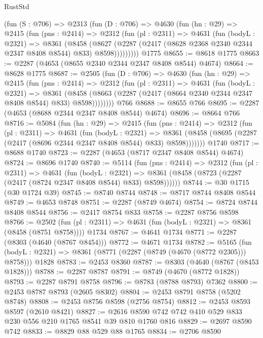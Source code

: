 \begin{lexlean}{RustStd}
\begin{coremodule}
    (fun (S : @706) =>
    @2313
      (fun (D : @706) =>
      @4630
        (fun (hn : @29) =>
        @2415
          (fun (pns : @2414) =>
          @2312
            (fun (pl : @2311) =>
            @4631
              (fun (bodyL : @2321) =>
              @8361
                (@8458
                  (@8627
                    (@2287 (@2417 (@8628 @2368 @2340 @2344 @2347 @8408 @8544) @833) @8598)))))))))
    @1775
@8655 := @8618 @1775
@8663 := @2287 (@4653 (@8655 @2340 @2344 @2347 @8408 @8544) @4674)
@8664 := @8628 @1775
@8687 := @2505
    (fun (D : @706) =>
    @4630
      (fun (hn : @29) =>
      @2415
        (fun (pns : @2414) =>
        @2312
          (fun (pl : @2311) =>
          @4631
            (fun (bodyL : @2321) =>
            @8361
              (@8458 (@8663 (@2287 (@2417 (@8664 @2340 @2344 @2347 @8408 @8544) @833) @8598))))))))
    @766
@8688 := @8655 @766
@8695 := @2287 (@4653 (@8688 @2344 @2347 @8408 @8544) @4674)
@8696 := @8664 @766
@8716 := @5084
    (fun (hn : @29) =>
    @2415
      (fun (pns : @2414) =>
      @2312
        (fun (pl : @2311) =>
        @4631
          (fun (bodyL : @2321) =>
          @8361 (@8458 (@8695 (@2287 (@2417 (@8696 @2344 @2347 @8408 @8544) @833) @8598)))))))
    @1740
@8717 := @8688 @1740
@8723 := @2287 (@4653 (@8717 @2347 @8408 @8544) @4674)
@8724 := @8696 @1740
@8740 := @5114
    (fun (pns : @2414) =>
    @2312
      (fun (pl : @2311) =>
      @4631
        (fun (bodyL : @2321) =>
        @8361 (@8458 (@8723 (@2287 (@2417 (@8724 @2347 @8408 @8544) @833) @8598))))))
@8744 := @30 @1715 (@30 @1724 @39)
@8745 := @8740 @8744
@8748 := @8717 @8744 @8408 @8544
@8749 := @4653 @8748
@8751 := @2287 (@8749 @4674)
@8754 := @8724 @8744 @8408 @8544
@8756 := @2417 @8754 @833
@8758 := @2287 @8756 @8598
@8766 := @2502
    (fun (pl : @2311) => @4631 (fun (bodyL : @2321) => @8361 (@8458 (@8751 @8758))))
    @1734
@8767 := @4641 @1734
@8771 := @2287 (@8303 (@4640 (@8767 @8454)))
@8772 := @4671 @1734
@8782 := @5165
    (fun (bodyL : @2321) => @8361 (@8771 (@2287 (@8749 (@4670 (@8772 @2305))) @8758)))
    @1828
@8783 := @2453 @8360
@8787 := @8303 (@4640 (@8767 (@8453 @1828)))
@8788 := @2287 @8787
@8791 := @8749 (@4670 (@8772 @1828))
@8793 := @2287 @8791 @8758
@8796 := @8783 (@8788 @8793) @7362
@8800 := @2453 @8787 @8793 (@2605 @8302)
@8804 := @2453 @8791 @8758 (@5202 @8748)
@8808 := @2453 @8756 @8598 (@2756 @8754)
@8812 := @2453 @8593 @8597 (@2610 @8421)
@8827 := @2616 @8590 @742 @742 @410 @529 @833 @230 @556 @210 @1765 @8541 @39 @810 @1760 @816
@8829 := @2697 @8590 @742
@8833 := @8829 @88 @529 @88 @1765
@8834 := @2706 @8590

\end{coremodule}
\end{lexlean}
